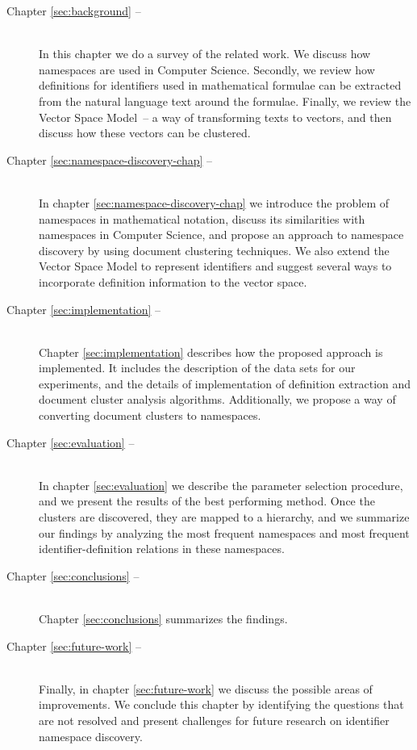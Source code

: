 \begin{description}
\item[Chapter \ref{sec:background} -- ] \hfill \\
  In this chapter we do a survey of the related work. We discuss how namespaces are
  used in Computer Science. Secondly, we review how definitions for identifiers 
  used in mathematical formulae can be extracted from the natural language text
  around the formulae. Finally, we review the Vector Space Model~-- a way of 
  transforming texts to vectors, and then discuss how these vectors can be 
  clustered. 

\item[Chapter \ref{sec:namespace-discovery-chap} -- ] \hfill \\
  In chapter \ref{sec:namespace-discovery-chap} we introduce the problem of namespaces 
  in mathematical notation, discuss its similarities with namespaces in Computer Science,
  and propose an approach to namespace discovery by using document clustering techniques. 
  We also extend the Vector Space Model to represent identifiers and suggest several 
  ways to incorporate definition information to the vector space. 

\item[Chapter \ref{sec:implementation} -- ] \hfill \\
  Chapter \ref{sec:implementation} describes how the proposed approach is implemented. 
  It includes the description of the data sets for our experiments, and the details of 
  implementation of definition extraction and document cluster analysis algorithms. 
  Additionally, we propose a way of converting document clusters to namespaces.

\item[Chapter \ref{sec:evaluation} -- ] \hfill \\
  In chapter \ref{sec:evaluation} we describe the parameter selection procedure,
  and we present the results of the best performing method. Once the clusters are 
  discovered, they are mapped to a hierarchy, and we summarize our findings 
  by analyzing the most frequent namespaces and most frequent identifier-definition
  relations in these namespaces.

\item[Chapter \ref{sec:conclusions} -- ] \hfill \\
  Chapter \ref{sec:conclusions} summarizes the findings.

\item[Chapter \ref{sec:future-work} -- ] \hfill \\
  Finally, in chapter \ref{sec:future-work} we discuss the possible areas of improvements.
  We conclude this chapter by identifying the questions that are not resolved and 
  present challenges for future research on identifier namespace discovery.

\end{description}